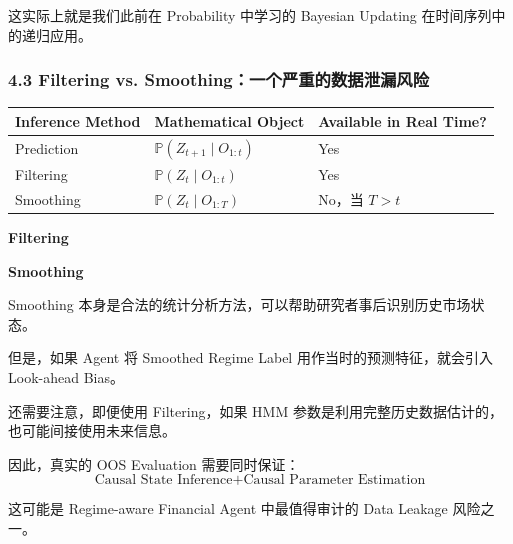 这实际上就是我们此前在 Probability 中学习的 Bayesian Updating 在时间序列中的递归应用。

\hypertarget{part-4-77-0001-filtering-vs.-smoothingux4e00ux4e2aux4e25ux91cdux7684ux6570ux636eux6cc4ux6f0fux98ceux9669}{%
\subsubsection{4.3 Filtering vs. Smoothing：一个严重的数据泄漏风险}\label{part-4-77-0001-filtering-vs.-smoothingux4e00ux4e2aux4e25ux91cdux7684ux6570ux636eux6cc4ux6f0fux98ceux9669}}

\begin{readertable}
\begin{longtable}[]{@{}
  >{\raggedright\arraybackslash}p{}
  >{\raggedright\arraybackslash}p{}
  >{\raggedright\arraybackslash}p{}@{}}
\toprule
Inference Method & Mathematical Object & Available in Real Time? \\
\midrule
\endhead
Prediction & \(\mathbb P(Z_{t+1}\mid O_{1:t})\) & Yes \\
Filtering & \(\mathbb P(Z_t\mid O_{1:t})\) & Yes \\
Smoothing & \(\mathbb P(Z_t\mid O_{1:T})\) & No，当 \(T>t\) \\
\bottomrule
\end{longtable}
\end{readertable}

\textbf{Filtering}


\textbf{Smoothing}


Smoothing 本身是合法的统计分析方法，可以帮助研究者事后识别历史市场状态。

但是，如果 Agent 将 Smoothed Regime Label 用作当时的预测特征，就会引入 Look-ahead Bias。

还需要注意，即便使用 Filtering，如果 HMM 参数是利用完整历史数据估计的，也可能间接使用未来信息。

因此，真实的 OOS Evaluation 需要同时保证：
\[\boxed{
\text{Causal State Inference}
+
\text{Causal Parameter Estimation}
}\]

这可能是 Regime-aware Financial Agent 中最值得审计的 Data Leakage 风险之一。

